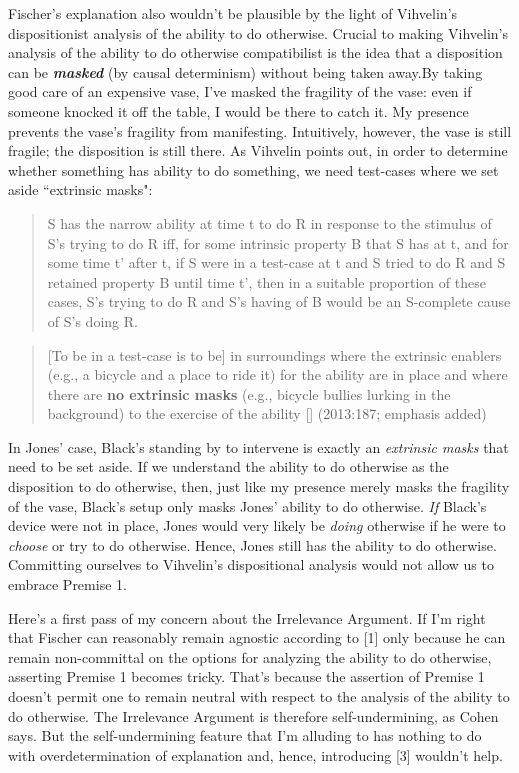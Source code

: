\documentclass[a4paper,12pt]{article}
\begin{document}
Fischer's explanation also wouldn't be plausible by the light of Vihvelin's dispositionist analysis of the ability to do otherwise. Crucial to making Vihvelin's analysis of the ability to do otherwise compatibilist is the idea that a disposition can be \textbf{\emph{masked}} (by causal determinism) without being taken away.\footnotemark By taking good care of an expensive vase, I've masked the fragility of the vase: even if someone knocked it off the table, I would be there to catch it. My presence prevents the vase's fragility from manifesting. Intuitively, however, the vase is still fragile; the disposition is still there. As Vihvelin points out, in order to determine whether something has ability to do something, we need test-cases where we set aside ``extrinsic masks":


\begin{quote} S has the narrow ability at time t to do R in response to the stimulus of S's trying to do R iff, for some intrinsic property B that S has at t, and for some time t' after t, if S were in a test-case at t and S tried to do R and S retained property B until time t', then in a suitable proportion of these cases, S's trying to do R and S's having of B would be an S-complete cause of S's doing R. \end{quote}

\begin{quote}[To be in a test-case is to be] in surroundings where the extrinsic enablers (e.g., a bicycle and a place to ride it) for the ability are in place and where there are \textbf{no extrinsic masks} (e.g., bicycle bullies lurking in the background) to the exercise of the ability [\textellipsis] (2013:187; emphasis added)\end{quote}

In Jones' case, Black's standing by to intervene is exactly an \emph{extrinsic masks} that need to be set aside. If we understand the ability to do otherwise as the disposition to do otherwise, then, just like my presence merely masks the fragility of the vase, Black's setup only masks Jones' ability to do otherwise. \emph{If} Black's device were not in place, Jones would very likely be \emph{doing} otherwise if he were to \emph{choose} or try to do otherwise. Hence, Jones still has the ability to do otherwise. Committing ourselves to Vihvelin's dispositional analysis would not allow us to embrace Premise 1.

Here's a first pass of my concern about the Irrelevance Argument. If I'm right that Fischer can reasonably remain agnostic according to [1] only because he can remain non-committal on the options for analyzing the ability to do otherwise, asserting Premise 1 becomes tricky. That's because the assertion of Premise 1 doesn't permit one to remain neutral with respect to the analysis of the ability to do otherwise. The Irrelevance Argument is therefore self-undermining, as Cohen says. But the self-undermining feature that I'm alluding to has nothing to do with overdetermination of explanation and, hence, introducing [3] wouldn't help.
\end{document}
